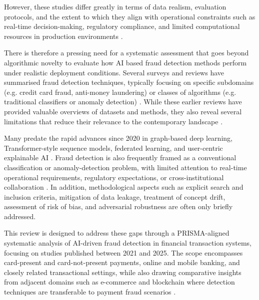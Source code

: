 \documentclass[a4paper,fleqn]{cas-dc}
\begin{document}
However, these studies differ greatly in terms of data realism, evaluation protocols, and the extent to which they align with operational constraints such as real-time decision-making, regulatory compliance, and limited computational resources in production environments \cite{chen_deep_2025, ahmed_secure_2024, khan_model-agnostic_2025}. 

There is therefore a pressing need for a systematic assessment that goes beyond algorithmic novelty to evaluate how AI based fraud detection methods perform under realistic deployment conditions.
Several surveys and reviews have summarised fraud detection techniques, typically focusing on specific subdomains (e.g. credit card fraud, anti-money laundering) or classes of algorithms (e.g. traditional classifiers or anomaly detection) \cite{adejoh_adaptive_2025, mousavian_review_2025, cherif_credit_2023, lalit_imbalance_2025}. 
While these earlier reviews have provided valuable overviews of datasets and methods, they also reveal several limitations that reduce their relevance to the contemporary landscape \cite{cherif_credit_2023, bin_sulaiman_review_2022, lim_review_2021}.

Many predate the rapid advances since 2020 in graph-based deep learning, Transformer-style sequence models, federated learning, and user-centric explainable AI \cite{alarfaj_enhancing_2025, deng_transformer-based_2025, khan_model-agnostic_2025}. 
Fraud detection is also frequently framed as a conventional classification or anomaly-detection problem, with limited attention to real-time operational requirements, regulatory expectations, or cross-institutional collaboration \cite{mill_opportunities_2023, awosika_transparency_2024, chhabra_voting_2023}. 
In addition, methodological aspects such as explicit search and inclusion criteria, mitigation of data leakage, treatment of concept drift, assessment of risk of bias, and adversarial robustness are often only briefly addressed\cite{cherif_credit_2023, khan_model-agnostic_2025, hafez_systematic_2025}.

This review is designed to address these gaps through a PRISMA-aligned systematic analysis of AI-driven fraud detection in financial transaction systems, focusing on studies published between 2021 and 2025. 
The scope encompasses card-present and card-not-present payments, online and mobile banking, and closely related transactional settings, while also drawing comparative insights from adjacent domains such as e-commerce and blockchain where detection techniques are transferable to payment fraud scenarios \cite{hafez_systematic_2025}.
\end{document}
